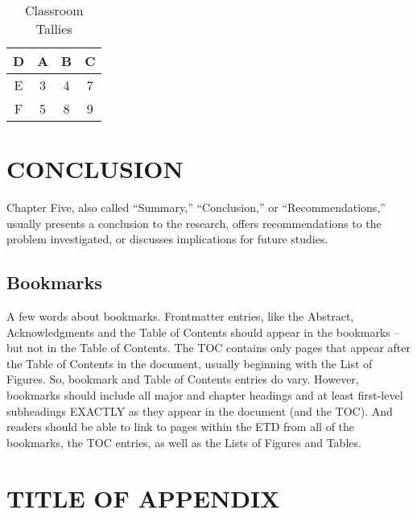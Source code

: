 \documentclass{UCF_ETD}
\begin{document}

\begin{table}[h]
\centering
\caption{Classroom Tallies}
\begin{tabular}{ |c|c|c|c|}
\hline
D & A & B & C\\
\hline
E &  3  & 4 & 7\\
\hline
F  &  5   & 8 & 9\\
\hline
\end{tabular}
\end{table}


\chapter{CONCLUSION}
Chapter Five, also called ``Summary,'' ``Conclusion,'' or ``Recommendations,'' usually presents a conclusion to the research, offers recommendations to the problem investigated, or discusses implications for future studies.

\section{Bookmarks}
A few words about bookmarks. Frontmatter entries, like the Abstract, Acknowledgments and the Table of Contents should appear in the bookmarks – but not in the Table of Contents. The TOC contains only pages that appear after the Table of Contents in the document, usually beginning with the List of Figures. So, bookmark and Table of Contents entries do vary.
However, bookmarks should include all major and chapter headings and at least first-level subheadings EXACTLY as they appear in the document (and the TOC). And readers should be able to link to pages within the ETD from all of the bookmarks, the TOC entries, as well as the Lists of Figures and Tables.

\appendix

\chapter{TITLE OF APPENDIX}
\newpage

\end{document}
